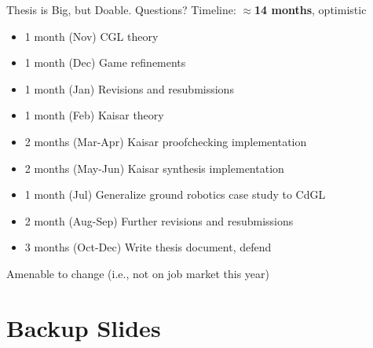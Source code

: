 \documentclass[slidestop,aspectratio=169]{beamer}
\newcommand{\CGL}{CGL\xspace}
\newcommand{\CdGL}{CdGL\xspace}
\theoremstyle{plain}
\theoremstyle{definition}
\theoremstyle{remark}
\begin{document}
\begin{frame}[t]{Thesis is Big, but Doable. Questions?}
Timeline: $\approx$\textbf{14 months}, optimistic
\begin{itemize}
\item 1 month (Nov) \CGL theory
\item 1 month (Dec) Game refinements
\item 1 month (Jan) Revisions and resubmissions
\item 1 month (Feb) Kaisar theory
\item 2 months (Mar-Apr) Kaisar proofchecking implementation
\item 2 months (May-Jun) Kaisar synthesis implementation
\item 1 month (Jul) Generalize ground robotics case study to \CdGL
\item 2 month (Aug-Sep) Further revisions and resubmissions
\item 3 months (Oct-Dec) Write thesis document, defend
\end{itemize}
Amenable to change (i.e., not on job market this year)
\end{frame}

\appendix

\section*{Backup Slides}
\end{document}
